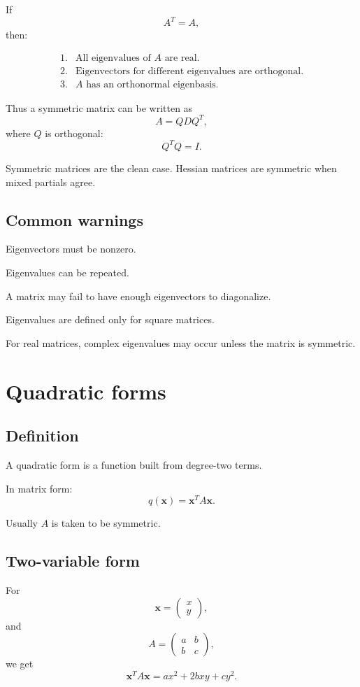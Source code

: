 If
\[
    A^T=A,
\]
then:

\[
\begin{array}{ll}
1. & \text{All eigenvalues of }A\text{ are real.}\\[1mm]
2. & \text{Eigenvectors for different eigenvalues are orthogonal.}\\[1mm]
3. & A\text{ has an orthonormal eigenbasis.}
\end{array}
\]

Thus a symmetric matrix can be written as
\[
\boxed{
    A=QDQ^T,
}
\]
where \(Q\) is orthogonal:
\[
\boxed{
    Q^TQ=I.
}
\]

Symmetric matrices are the clean case.  Hessian matrices are symmetric when mixed
partials agree.

\subsection*{Common warnings}

Eigenvectors must be nonzero.

Eigenvalues can be repeated.

A matrix may fail to have enough eigenvectors to diagonalize.

Eigenvalues are defined only for square matrices.

For real matrices, complex eigenvalues may occur unless the matrix is symmetric.

\section{Quadratic forms}
\label{app:C.6}

\subsection*{Definition}

A quadratic form is a function built from degree-two terms.

In matrix form:
\[
\boxed{
    q(\mathbf x)=\mathbf x^T A\mathbf x.
}
\]

Usually \(A\) is taken to be symmetric.

\subsection*{Two-variable form}

For
\[
    \mathbf x=
    \begin{pmatrix}
    x\\
    y
    \end{pmatrix},
\]
and
\[
    A=
    \begin{pmatrix}
    a&b\\
    b&c
    \end{pmatrix},
\]
we get
\[
\boxed{
    \mathbf x^T A\mathbf x
    =
    ax^2+2bxy+cy^2.
}
\]

